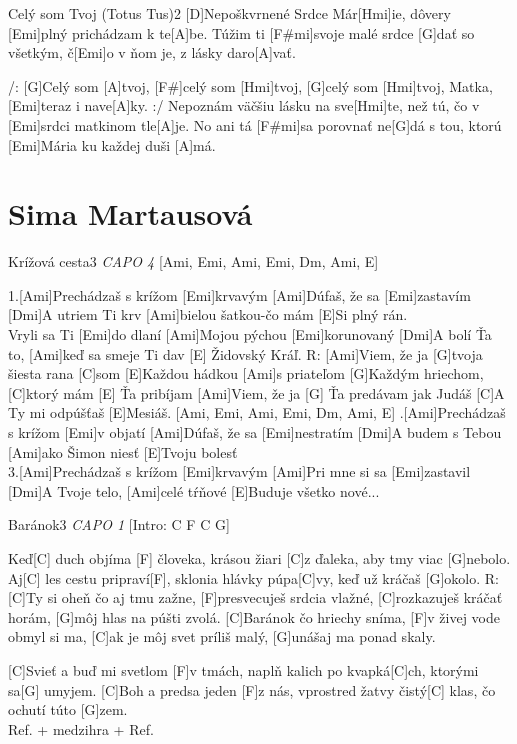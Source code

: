 \documentclass[12pt]{article}
\begin{document}
\begin{song}{Celý som Tvoj (Totus Tus)}{2}
	[D]Nepoškvrnené Srdce Már[Hmi]ie,
	dôvery [Emi]plný prichádzam k te[A]be.
	Túžim ti [F#mi]svoje malé srdce [G]dať
	so všetkým, č[Emi]o v ňom je,
	z lásky daro[A]vať.
	
	/: [G]Celý som [A]tvoj, [F#]celý som [Hmi]tvoj,
	[G]celý som [Hmi]tvoj, Matka,[Emi]teraz i nave[A]ky. :/
	\columnbreak
	[D]Nepoznám väčšiu lásku na sve[Hmi]te,
	než tú, čo v [Emi]srdci matkinom tle[A]je.
	No ani tá [F#mi]sa porovnať ne[G]dá s tou,
	ktorú [Emi]Mária ku každej duši [A]má.
\end{song}

\newpage
\section{Sima Martausová}

\begin{song}{Krížová cesta}{3}
	\textit{CAPO 4}
	[Ami, Emi, Ami, Emi, Dm, Ami, E]
	
	1.[Ami]Prechádzaš s krížom [Emi]krvavým
	[Ami]Dúfaš, že sa [Emi]zastavím
	[Dmi]A utriem Ti krv [Ami]bielou šatkou-čo mám
	[E]Si plný rán.
	\\
	[Ami]Vryli sa Ti [Emi]do dlaní
	[Ami]Mojou pýchou [Emi]korunovaný
	[Dmi]A bolí Ťa to, [Ami]keď sa smeje Ti dav
	[E] Židovský Kráľ.
	\columnbreak
	R: [Ami]Viem, že ja [G]tvoja šiesta rana [C]som
	[E]Každou hádkou [Ami]s priateľom
	[G]Každým hriechom, [C]ktorý mám
	[E] Ťa pribíjam
	[Ami]Viem, že ja [G] Ťa predávam jak Judáš
	[C]A Ty mi odpúšťaš [E]Mesiáš.
	[Ami, Emi, Ami, Emi, Dm, Ami, E]
	.[Ami]Prechádzaš s krížom [Emi]v objatí
	[Ami]Dúfaš, že sa [Emi]nestratím
	[Dmi]A budem s Tebou [Ami]ako Šimon niesť
	[E]Tvoju bolesť
	\\
	3.[Ami]Prechádzaš s krížom [Emi]krvavým
	[Ami]Pri mne si sa [Emi]zastavil
	[Dmi]A Tvoje telo, [Ami]celé tŕňové
	[E]Buduje všetko nové...
\end{song}

\begin{song}{Baránok}{3}
	\textit{CAPO 1}
	[Intro: C F C G]
	
	Keď[C] duch objíma [F] človeka,
	krásou žiari [C]z ďaleka,
	aby tmy viac [G]nebolo.
	Aj[C] les cestu pripraví[F],
	sklonia hlávky púpa[C]vy,
	keď už kráčaš [G]okolo.
	\columnbreak
	R: [C]Ty si oheň čo aj tmu zažne,
	[F]presvecuješ srdcia vlažné,
	[C]rozkazuješ kráčať horám,
	[G]môj hlas na púšti zvolá.
	[C]Baránok čo hriechy sníma,
	[F]v živej vode obmyl si ma,
	[C]ak je môj svet príliš malý,
	[G]unášaj ma ponad skaly.
	\columnbreak
	[Medzihra (2x): C F C G]
	
	[C]Svieť a buď mi svetlom [F]v tmách,
	naplň kalich po kvapká[C]ch,
	ktorými sa[G] umyjem.
	[C]Boh a predsa jeden [F]z nás,
	vprostred žatvy čistý[C] klas,
	čo ochutí túto [G]zem.
	\\
	Ref. + medzihra + Ref.
\end{song}
\end{document}
